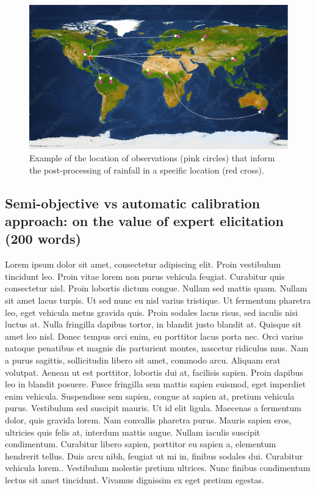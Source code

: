 \documentclass[techmemo]{ecmwfrep}%
\begin{document}
\begin{figure}
\includegraphics{Figures/Remote_Calibration.png}
\caption{Example of the location of observations (pink circles) that inform the post-processing of rainfall in a specific location (red cross).}
\label{Remote_Calibration}
\end{figure}

\subsection{Semi-objective vs automatic calibration approach: on the value of expert elicitation (200 words)}
Lorem ipsum dolor sit amet, consectetur adipiscing elit. Proin vestibulum tincidunt leo. Proin vitae lorem non purus vehicula feugiat. Curabitur quis consectetur nisl. Proin lobortis dictum congue. Nullam sed mattis quam. Nullam sit amet lacus turpis. Ut sed nunc eu nisl varius tristique. Ut fermentum pharetra leo, eget vehicula metus gravida quis. Proin sodales lacus risus, sed iaculis nisi luctus at. Nulla fringilla dapibus tortor, in blandit justo blandit at. Quisque sit amet leo nisl. Donec tempus orci enim, eu porttitor lacus porta nec. Orci varius natoque penatibus et magnis dis parturient montes, nascetur ridiculus mus. Nam a purus sagittis, sollicitudin libero sit amet, commodo arcu. Aliquam erat volutpat. Aenean ut est porttitor, lobortis dui at, facilisis sapien. Proin dapibus leo in blandit posuere. Fusce fringilla sem mattis sapien euismod, eget imperdiet enim vehicula. Suspendisse sem sapien, congue at sapien at, pretium vehicula purus. Vestibulum sed suscipit mauris. Ut id elit ligula. Maecenas a fermentum dolor, quis gravida lorem. Nam convallis pharetra purus. Mauris sapien eros, ultricies quis felis at, interdum mattis augue. Nullam iaculis suscipit condimentum. Curabitur libero sapien, porttitor eu sapien a, elementum hendrerit tellus. Duis arcu nibh, feugiat ut mi in, finibus sodales dui. Curabitur vehicula lorem.. Vestibulum molestie pretium ultrices. Nunc finibus condimentum lectus sit amet tincidunt. Vivamus dignissim ex eget pretium egestas.
\end{document}
